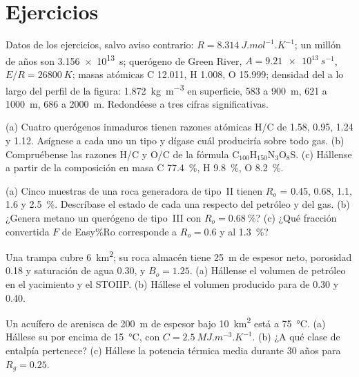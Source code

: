 \section*{Ejercicios}\label{sec:b2:energy-geology:exercises}

Datos de los ejercicios, salvo aviso contrario: $R = \qty{8.314}{J.mol^{-1}.K^{-1}}$; un millón de
años son \qty{3.156e13}{s}; querógeno de Green River, $A = \qty{9.21e13}{s^{-1}}$, $E/R = \qty{26800}{K}$;
masas atómicas C 12.011, H 1.008, O 15.999; densidad del  a lo largo del perfil de la figura:
\qty{1.872}{kg.m^{-3}} en superficie, 583 a \qty{900}{m}, 621 a \qty{1000}{m}, 686 a
\qty{2000}{m}. Redondéese a tres cifras significativas.

\begin{exercise}[$\star$]\label{exo:b2:energy-geology:1}
(a) Cuatro querógenos inmaduros tienen razones atómicas H/C de 1.58, 0.95, 1.24 y 1.12. Asígnese a cada uno un tipo y dígase
cuál produciría sobre todo gas. (b) Compruébense las razones H/C y O/C de la fórmula
C$_{100}$H$_{150}$N$_3$O$_8$S. (c) Hállense a partir de la composición en masa C \qty{77.4}{\percent}, H
\qty{9.8}{\percent}, O \qty{8.2}{\percent}.
\end{exercise}

\begin{exercise}[$\star$]\label{exo:b2:energy-geology:2}
(a) Cinco muestras de una roca generadora de tipo~II tienen $R_o$ = 0.45, 0.68, 1.1, 1.6 y \qty{2.5}{\percent}.
Descríbase el estado de cada una respecto del petróleo y del gas. (b) ¿Genera metano un querógeno de tipo~III con $R_o =
\qty{0.68}{\percent}$? (c) ¿Qué fracción convertida $F$ de Easy\%Ro corresponde a
$R_o = 0.6$ y al \qty{1.3}{\percent}?
\end{exercise}

\begin{exercise}[$\star$]\label{exo:b2:energy-geology:3}
Una trampa cubre \qty{6}{km^2}; su roca almacén tiene \qty{25}{m} de espesor neto, porosidad 0.18 y saturación de agua
0.30, y $B_o = 1.25$. (a) Hállense el volumen de petróleo en el yacimiento y el STOIIP. (b) Hállese
el volumen producido para  de 0.30 y 0.40.
\end{exercise}

\begin{exercise}[$\star$]\label{exo:b2:energy-geology:4}
Un acuífero de arenisca de \qty{200}{m} de espesor bajo \qty{10}{km^2} está a \qty{75}{\celsius}. (a) Hállese su
 por encima de \qty{15}{\celsius}, con $C = \qty{2.5}{MJ.m^{-3}.K^{-1}}$. (b) ¿A qué
clase de entalpía pertenece? (c) Hállese la potencia térmica media durante 30 años para $R_g = 0.25$.
\end{exercise}

